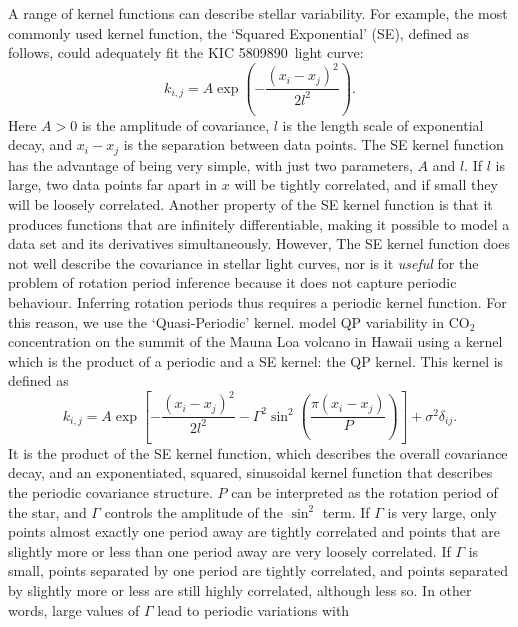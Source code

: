 \documentclass[useAMS, usenatbib, preprint, 12pt]{aastex}
\newcommand{\eg}{{\it e.g.}}
\newcommand{\kepexample}{5809890}
\begin{document}
A range of kernel functions can describe stellar variability.
For example, the most commonly used kernel function, the `Squared
Exponential' (SE), defined as follows, could adequately fit the
KIC \kepexample\ light curve:
\begin{equation}
\label{eq:SE}
k_{i,j} = A \exp \left(-\frac{(x_i - x_j)^2}{2l^2} \right).
\end{equation}
Here $A>0$ is the amplitude of covariance, $l$ is the length scale of
exponential decay, and $x_i-x_j$ is the separation between data points.
The SE kernel function has the advantage of being very simple, with
just two parameters, $A$ and $l$.
If $l$ is large, two data points far apart in $x$ will be tightly correlated,
and if small they will be loosely correlated.
Another property of the SE kernel function is that it produces functions that
are infinitely differentiable, making it possible to model a data set
and its derivatives simultaneously.
However, The SE kernel function does not well describe the covariance
in stellar light curves, nor is it {\it useful} for the problem of
rotation period inference because it does not capture periodic behaviour.
Inferring rotation periods thus requires a periodic kernel
function.
For this reason, we use the `Quasi-Periodic' kernel.
\citet{Rasmussen2005} model QP variability in CO$_2$ concentration on the
summit of the Mauna Loa volcano in Hawaii \citep[data from][]{Keeling2004}
using a kernel which is the product of a periodic and a SE kernel: the QP
kernel.
This kernel is defined as
\begin{equation}
\label{eq:QP}
k_{i,j} = A \exp \left[-\frac{(x_i - x_j)^2}{2l^2} -
    \Gamma^2 \sin^2\left(\frac{\pi(x_i - x_j)}{P}\right) \right] + \sigma^2
    \delta_{ij}.
\end{equation}
It is the product of the SE kernel function, which describes the overall
covariance decay, and an exponentiated, squared, sinusoidal kernel function
that describes the periodic covariance structure.
$P$ can be interpreted as the rotation period of the star, and $\Gamma$
controls the amplitude of the $\sin^2$ term.
If $\Gamma$ is very large, only points almost exactly one period away are
tightly correlated and points that are slightly more or less than one period
away are very loosely correlated.
If $\Gamma$ is small, points separated by one period are tightly
correlated, and points separated by slightly more or less are still highly
correlated, although less so.
In other words, large values of $\Gamma$ lead to periodic variations with
\end{document}
